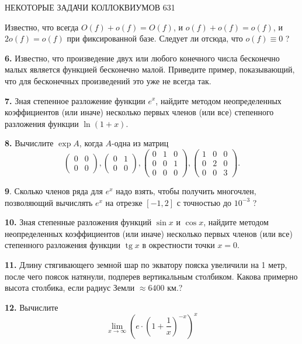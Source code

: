 \documentclass{article}
\newcommand\hr{\par\vspace{-.5\ht\strutbox}\noindent\hrulefill\par}
\begin{document}
\thispagestyle{empty}
НЕКОТОРЫЕ ЗАДАЧИ КОЛЛОКВИУМОВ \mbox{}\hfill 631

\hr
\bigskip
Известно, что всегда $O(f)+o(f)=O(f)$, и $o(f)+o(f)=o(f)$, и $2 o(f)=o(f)$ при фиксированной базе. Следует ли отсюда, что $o(f) \equiv 0$ ?

\textbf{6.} Известно, что произведение двух или любого конечного числа бесконечно малых является функцией бесконечно малой. Приведите пример, показывающий, что для бесконечных произведений это уже не всегда так.

\textbf{7. }Зная степенное разложение функции $e^x$, найдите методом неопределенных коэффициентов (или иначе) несколько первых членов (или все) степенного разложения функции $\ln (1+x)$.

\textbf{8. }Вычислите $\exp A$, когда $A$-одна из матриц
$$
\left(\begin{array}{ll}
0 & 0 \\
0 & 0
\end{array}\right),\left(\begin{array}{ll}
0 & 1 \\
0 & 0
\end{array}\right),\left(\begin{array}{lll}
0 & 1 & 0 \\
0 & 0 & 1 \\
0 & 0 & 0
\end{array}\right),\left(\begin{array}{lll}
1 & 0 & 0 \\
0 & 2 & 0 \\
0 & 0 & 3
\end{array}\right) .
$$

\textbf{9}. Сколько членов ряда для $e^x$ надо взять, чтобы получить многочлен, позволяющий вычислять $e^x$ на отрезке $[-1,2]$ с точностью до $10^{-3}$ ?

\textbf{10. } Зная степенные разложения функций $\sin x$ и $\cos x$, найдите методом неопределенных коэффициентов (или иначе) несколько первых членов (или все) степенного разложения функции $\operatorname{tg} x$ в окрестности точки $x=0$.

\textbf{11. }Длину стягивающего земной шар по экватору пояска увеличили на 1 метр, после чего поясок натянули, подперев вертикальным столбиком. Какова примерно высота столбика, если радиус Земли $\approx 6400$ км.?

\textbf{12.} Вычислите
$$
\lim _{x \rightarrow \infty}\left(e \cdot\left(1+\frac{1}{x}\right)^{-x}\right)^x
$$
\end{document}

